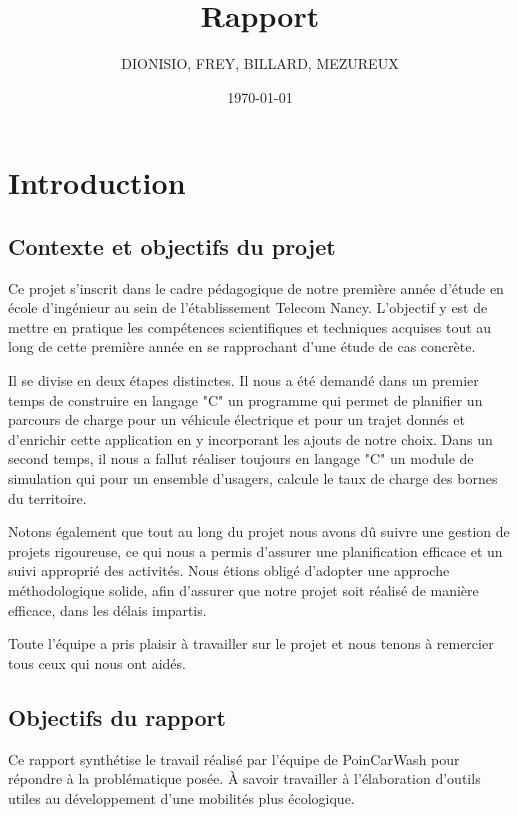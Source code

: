 \documentclass[a4paper, 12pt]{report}
\title{Rapport}
\author{DIONISIO, FREY, BILLARD, MEZUREUX}
\date{\today}
\begin{document}
\maketitle
\dominitoc
{}
\tableofcontents

\chapter{Introduction}
\minitoc
{}
\clearpage
    
    \section{Contexte et objectifs du projet}

Ce projet s'inscrit dans le cadre pédagogique de notre première année d'étude en école d'ingénieur au sein de l'établissement Telecom Nancy. L'objectif y est de mettre en pratique les compétences scientifiques et techniques acquises tout au long de cette première année en se rapprochant d'une étude de cas concrète.
\bigskip

Il se divise en deux étapes distinctes. Il nous a été demandé dans un premier temps de construire en langage "C" un programme qui permet de planifier un parcours de charge pour un véhicule électrique et pour un trajet donnés et d'enrichir cette application en y incorporant les ajouts de notre choix. Dans un second temps, il nous a fallut réaliser toujours en langage "C" un module de simulation qui pour un ensemble d'usagers, calcule le taux de charge des bornes du territoire.
\bigskip

Notons également que tout au long du projet nous avons dû suivre une gestion de projets rigoureuse, ce
qui nous a permis d’assurer une planification efficace et un suivi approprié des activités. Nous étions
obligé d'adopter une approche méthodologique solide, afin d’assurer que notre projet soit réalisé de manière efficace, dans les délais impartis.
\bigskip

Toute l’équipe a pris plaisir à travailler sur le projet et nous tenons à remercier tous ceux qui nous
ont aidés.

    \section{Objectifs du rapport}

Ce rapport synthétise le travail réalisé par l'équipe de PoinCarWash pour répondre à la problématique posée. À savoir travailler à l'élaboration d'outils utiles au développement d'une mobilités plus écologique.
    
\end{document}
